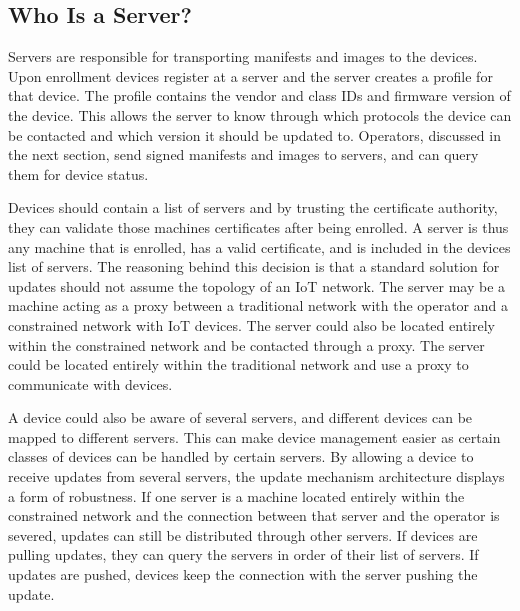 \documentclass[0-thesis.tex]{subfiles}
\begin{document}
\subsection{Who Is a Server?}
\label{ssec:who-is-a-server}
Servers are responsible for transporting manifests and images to the devices. Upon
enrollment devices register at a server and the server creates a profile for that device.
The profile contains the vendor and class IDs and firmware version of the device. This
allows the server to know through which protocols the device can be contacted and which
version it should be updated to. Operators, discussed in the next section, send signed
manifests and images to servers, and can query them for device status.

Devices should contain a list of servers and by trusting the certificate authority, they
can validate those machines certificates after being enrolled. A server is thus any
machine that is enrolled, has a valid certificate, and is included in the devices list of
servers. The reasoning behind this decision is that a standard solution for updates should
not assume the topology of an IoT network. The server may be a machine acting as a proxy
between a traditional network with the operator and a constrained network with IoT
devices. The server could also be located entirely within the constrained network and be
contacted through a proxy. The server could be located entirely within the traditional
network and use a proxy to communicate with devices. 

A device could also be aware of several servers, and different devices can be mapped to
different servers. This can make device management easier as certain classes of devices
can be handled by certain servers. By allowing a device to receive updates from several
servers, the update mechanism architecture displays a form of robustness. If one server is
a machine located entirely within the constrained network and the connection between that
server and the operator is severed, updates can still be distributed through other
servers. If devices are pulling updates, they can query the servers in order of their list
of servers. If updates are pushed, devices keep the connection with the server pushing the
update.
\end{document}

